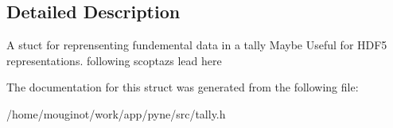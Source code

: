 \subsection{Detailed Description}
A stuct for reprensenting fundemental data in a tally Maybe Useful for H\+D\+F5 representations. following scoptaz\textquotesingle{}s lead here 

The documentation for this struct was generated from the following file\+:\begin{DoxyCompactItemize}
\item 
/home/mouginot/work/app/pyne/src/tally.\+h\end{DoxyCompactItemize}
